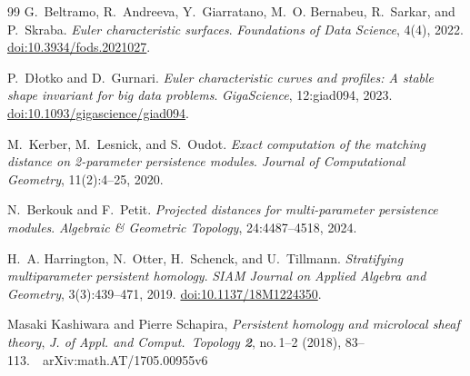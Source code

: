 \documentclass[11pt]{article}
\theoremstyle{definition}
\theoremstyle{remark}
\begin{document}
\begin{thebibliography}{99}
G.~Beltramo, R.~Andreeva, Y.~Giarratano, M.~O. Bernabeu, R.~Sarkar, and P.~Skraba.
\newblock \emph{Euler characteristic surfaces}.
\newblock \emph{Foundations of Data Science}, 4(4), 2022.
\newblock \href{https://doi.org/10.3934/fods.2021027}{doi:10.3934/fods.2021027}.

P.~D\l{}otko and D.~Gurnari.
\newblock \emph{Euler characteristic curves and profiles: A stable shape invariant for big data problems}.
\newblock \emph{GigaScience}, 12:giad094, 2023.
\newblock \href{https://doi.org/10.1093/gigascience/giad094}{doi:10.1093/gigascience/giad094}.

M.~Kerber, M.~Lesnick, and S.~Oudot.
\newblock \emph{Exact computation of the matching distance on 2-parameter persistence modules}.
\newblock \emph{Journal of Computational Geometry}, 11(2):4--25, 2020.

N.~Berkouk and F.~Petit.
\newblock \emph{Projected distances for multi-parameter persistence modules}.
\newblock \emph{Algebraic \& Geometric Topology}, 24:4487--4518, 2024.

H.~A. Harrington, N.~Otter, H.~Schenck, and U.~Tillmann.
\newblock \emph{Stratifying multiparameter persistent homology}.
\newblock \emph{SIAM Journal on Applied Algebra and Geometry}, 3(3):439--471, 2019.
\newblock \href{https://doi.org/10.1137/18M1224350}{doi:10.1137/18M1224350}.

Masaki Kashiwara and Pierre Schapira, 
\newblock \emph{Persistent homology and microlocal sheaf theory}, 
\newblock \emph{J. of Appl. and Comput.\ Topology \textbf{2}}, no.\,1--2 (2018), 83--113.\ \
\newblock \textsf{arXiv:math.AT/1705.00955v6}

\end{thebibliography}
\end{document}
